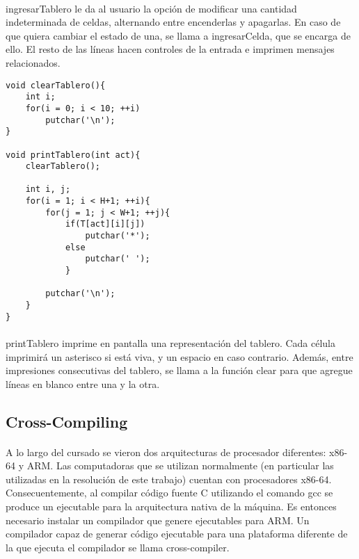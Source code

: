 \documentclass{article}
\begin{document}
\paragraph{}
ingresarTablero le da al usuario la opci\'on de modificar una cantidad indeterminada de celdas, alternando entre encenderlas y apagarlas. En caso de que quiera cambiar el estado de una, se llama a ingresarCelda, que se encarga de ello. El resto de las l\'ineas hacen controles de la entrada e imprimen mensajes relacionados.

\begin{lstlisting}
void clearTablero(){
	int i;
	for(i = 0; i < 10; ++i)
		putchar('\n');
}

void printTablero(int act){
	clearTablero();
	
	int i, j;
	for(i = 1; i < H+1; ++i){
		for(j = 1; j < W+1; ++j){
			if(T[act][i][j])
				putchar('*');
			else
				putchar(' ');
			}
		
		putchar('\n');
	}	
}
\end{lstlisting}
		
\paragraph{}
printTablero imprime en pantalla una representaci\'on del tablero. Cada c\'elula imprimir\'a un asterisco si est\'a viva, y un espacio en caso contrario. Adem\'as, entre impresiones consecutivas del tablero, se llama a la funci\'on clear para que agregue l\'ineas en blanco entre una y la otra. 

\subsection{Cross-Compiling}

\paragraph{}
A lo largo del cursado se vieron dos arquitecturas de procesador diferentes: x86-64 y ARM. Las computadoras que se utilizan normalmente (en particular las utilizadas en la resoluci\'on de este trabajo) cuentan con procesadores x86-64. Consecuentemente, al compilar c\'odigo fuente C utilizando el comando gcc se produce un ejecutable para la arquitectura nativa de la m\'aquina. Es entonces necesario instalar un compilador que genere ejecutables para ARM. Un compilador capaz de generar c\'odigo ejecutable para una plataforma diferente de la que ejecuta el compilador se llama cross-compiler. 
\end{document}
